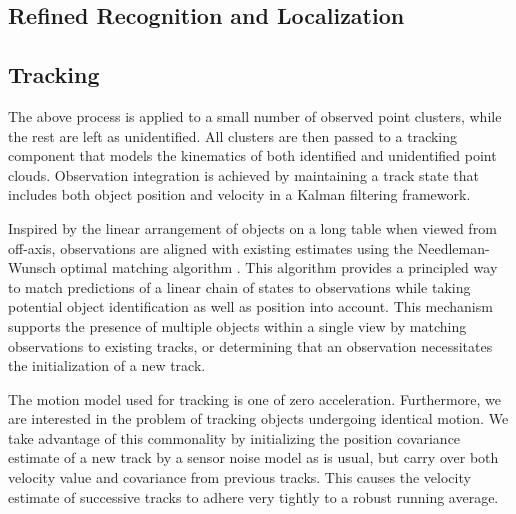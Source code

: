 \documentclass[letterpaper, 10 pt, conference]{ieeeconf}  %
\begin{document}
\subsection{Refined Recognition and Localization}


\subsection{Tracking}
The above process is applied to a small number of observed point
clusters, while the rest are left as unidentified. All clusters are
then passed to a tracking component that models the kinematics of both
identified and unidentified point clouds. Observation integration is
achieved by maintaining a track state that includes both object
position and velocity in a Kalman filtering framework.

Inspired by the linear arrangement of objects on a long table when
viewed from off-axis, observations are aligned with existing estimates
using the Needleman-Wunsch optimal matching algorithm
\cite{NeedlemanWunsch1970}. This algorithm provides a principled way
to match predictions of a linear chain of states to observations while
taking potential object identification as well as position into
account. This mechanism supports the presence of multiple objects
within a single view by matching observations to existing tracks, or
determining that an observation necessitates the initialization of a
new track.


The motion model used for tracking is one of zero
acceleration. Furthermore, we are interested in the problem of
tracking objects undergoing identical motion. We take advantage of
this commonality by initializing the position covariance estimate of a
new track by a sensor noise model as is usual, but carry over both
velocity value and covariance from previous tracks. This causes the
velocity estimate of successive tracks to adhere very tightly to a
robust running average.
\end{document}
